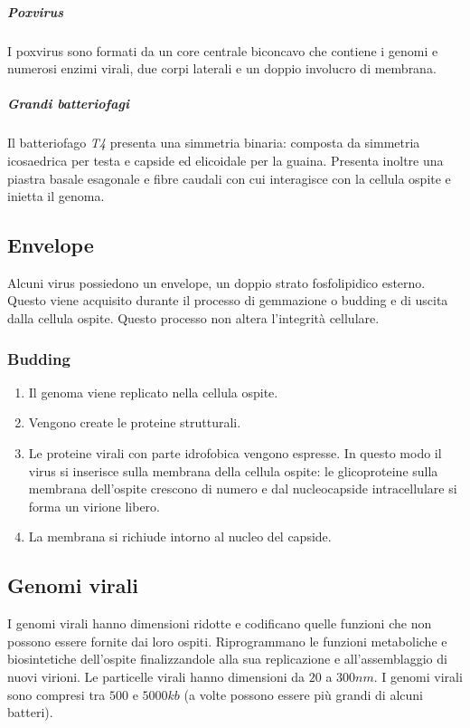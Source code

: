 				\subparagraph{Poxvirus}
				I poxvirus sono formati da un core centrale biconcavo che contiene i genomi e numerosi enzimi virali, due corpi laterali e un doppio involucro di membrana.

				\subparagraph{Grandi batteriofagi}
				Il batteriofago \emph{T4} presenta una simmetria binaria: composta da simmetria icosaedrica per testa e capside ed elicoidale per la guaina.
				Presenta inoltre una piastra basale esagonale e fibre caudali con cui interagisce con la cellula ospite e inietta il genoma.

	\subsection{Envelope}
	Alcuni virus possiedono un envelope, un doppio strato fosfolipidico esterno.
	Questo viene acquisito durante il processo di gemmazione o budding e di uscita dalla cellula ospite.
	Questo processo non altera l'integrit\`a cellulare.
		
		\subsubsection{Budding}
		\begin{multicols}{2}
			\begin{enumerate}
   					\item Il genoma viene replicato nella cellula ospite.
   					\item Vengono create le proteine strutturali.
   					\item Le proteine virali con parte idrofobica vengono espresse. 
					In questo modo il virus si inserisce sulla membrana della cellula ospite: le glicoproteine sulla membrana dell'ospite crescono di numero e dal nucleocapside intracellulare si forma un virione libero.
				\item La membrana si richiude intorno al nucleo del capside.
			\end{enumerate}
		\end{multicols}
		
	\subsection{Genomi virali}
	I genomi virali hanno dimensioni ridotte e codificano quelle funzioni che non possono essere fornite dai loro ospiti. 
	Riprogrammano le funzioni metaboliche e biosintetiche dell'ospite finalizzandole alla sua replicazione e all'assemblaggio di nuovi virioni. 
	Le particelle virali hanno dimensioni da $20$ a $300 \si{nm}$.
	I genomi virali sono compresi tra $500$ e $5000 kb$ (a volte possono essere pi\`u grandi di alcuni batteri).

